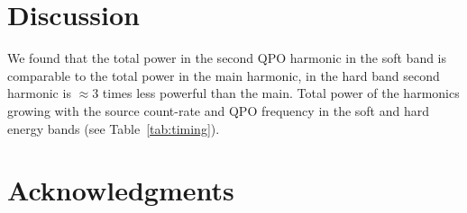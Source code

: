 \documentclass[a4paper,fleqn,usenatbib]{mnras}
\begin{document}
\section{Discussion}
We found that the total power in the second QPO harmonic in the soft band is comparable to the total power in the main harmonic, in the hard band second harmonic is $\approx3$ times less powerful than the main. 
Total power of the harmonics growing with the source count-rate and QPO frequency in the soft and hard energy bands (see Table~\ref{tab:timing}). 






\section*{Acknowledgments}



\bsp	
\label{lastpage}
\end{document}

